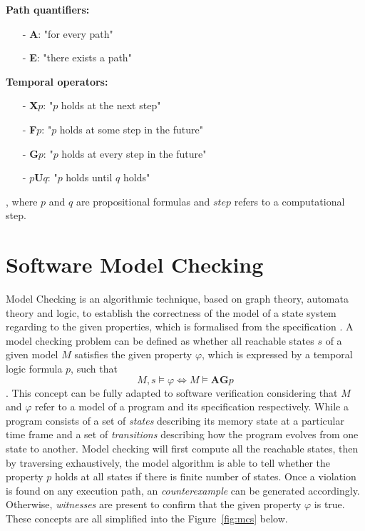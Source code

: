\smallskip
\noindent
\begin{minipage}[t]{.35\textwidth}\small
\textbf{Path quantifiers:}
\begin{itemize} [leftmargin=*, topsep=3pt,itemsep=0ex] 
    \item[-] \textbf{A}: "for every path"
    \item[-] \textbf{E}: "there exists a path"
\end{itemize}
\end{minipage}\hfill
\begin{minipage}[t]{.55\textwidth}\small
\textbf{Temporal operators:}
    \begin{itemize} [leftmargin=*, topsep=3pt,itemsep=0ex]
        \item[-] \textbf{X}$p$: "$p$ holds at the next step"
        \item[-] \textbf{F}$p$: "$p$ holds at some step in the future"
        \item[-] \textbf{G}$p$: "$p$ holds at every step in the future"
        \item[-] $p$\textbf{U}$q$: "$p$ holds until $q$ holds"
   \end{itemize}
\end{minipage}
\bigskip

\noindent
, where $p$ and $q$ are propositional formulas and $step$ refers to a computational step.
 
\section{Software Model Checking} \label{sec:mc}
Model Checking is an algorithmic technique, based on graph theory, automata theory and logic, \cite{Vardi2005} to establish the correctness of the model of a state system regarding to the given properties, which is formalised from the specification \cite{Clarke:2000:MC:332656, Clarke:2008:BMC:1423535.1423536}. A model checking problem can be defined as whether all reachable states $s$ of a given model $M$ satisfies the given property $\varphi$, which is expressed by a temporal logic formula $p$, such that $$M, s \models \varphi \Leftrightarrow M \models \textbf{AG}p$$. This concept can be fully adapted to software verification considering that $M$ and $\varphi$ refer to a model of a program and its specification respectively. While a program consists of a set of \textit{states} describing its memory state at a particular time frame and a set of \textit{transitions} describing how the program evolves from one state to another. Model checking will first compute all the reachable states, then by traversing exhaustively, the model algorithm is able to tell whether the property $p$ holds at all states if there is finite number of states. Once a violation is found on any execution path, an \textit{counterexample} can be generated accordingly. Otherwise, \textit{witnesses} are present to confirm that the given property $\varphi$ is true. These concepts are all simplified into the Figure~\ref{fig:mcs} below.

